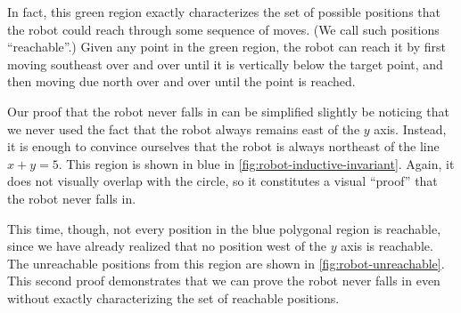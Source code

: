In fact, this green region exactly characterizes
  the set of possible positions that the robot could reach
  through some sequence of moves.
(We call such positions ``reachable''.)
Given any point in the green region,
  the robot can reach it by first moving southeast over and over until
  it is vertically below the target point,
  and then moving due north over and over until the point is reached.

Our proof that the robot never falls in
  can be simplified slightly be noticing
  that we never used the fact that
  the robot always remains east of the $y$ axis.
Instead, it is enough to convince ourselves that
  the robot is always northeast of the line $x + y = 5$.
This region is shown in blue in \cref{fig:robot-inductive-invariant}.
Again, it does not visually overlap with the circle,
  so it constitutes a visual ``proof'' that the robot never falls in.

This time, though, not every position in the blue polygonal region is reachable,
  since we have already realized that no position west of the $y$ axis is reachable.
The unreachable positions from this region are shown in \cref{fig:robot-unreachable}.
This second proof demonstrates that we can prove the robot never falls in
  even without exactly characterizing the set of reachable positions.

